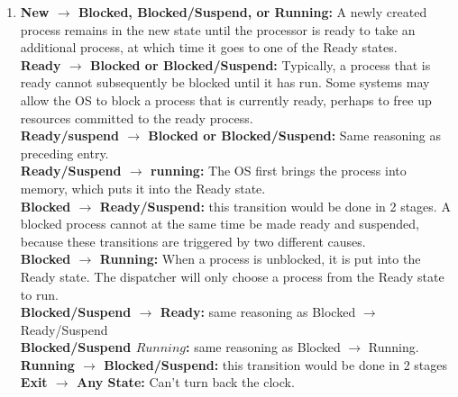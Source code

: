 \documentclass[12pt]{article}
\begin{document}
\begin{enumerate}
{\begin{enumerate}
    \textbf{Running $\rightarrow$ Blocked:} A process is put in the Blocked state if it requests some- thing for which it must wait. A request to the OS is usually in the form of a system service call; that is, a call from the running program to a procedure that is part of the operating system code. For example, a process may request a service from the OS that the OS is not prepared to perform immediately. It can request a resource, such as a file or a shared section of virtual memory, that is not immediately available. Or the process may initiate an action, such as an I/O operation, that must be completed before the process can continue. When processes communicate with each other, a process may be blocked when it is waiting for another process to provide data or waiting for a message from another process.\\
    \textbf{Any State $\rightarrow$ Exit: }Typically, a process terminates while it is running, either because it has completed or because of some fatal fault condition. However, in some operating systems, a process may be terminated by the process that created it or when the parent process is itself terminated. If this is allowed, then a process in any state can be moved to the Exit state.
    \item \textbf{New $\rightarrow$ Blocked, Blocked/Suspend, or Running:} A newly created process remains in the new state until the processor is ready to take an additional process, at which time it goes to one of the Ready states.\\
    \textbf{Ready $\rightarrow$ Blocked or Blocked/Suspend:} Typically, a process that is ready cannot subsequently be blocked until it has run. Some systems may allow the OS to block a process that is currently ready, perhaps to free up resources committed to the ready process.\\
    \textbf{Ready/suspend $\rightarrow$ Blocked or Blocked/Suspend:} Same reasoning as preceding entry.\\
    \textbf{Ready/Suspend $\rightarrow$ running: }The OS first brings the process into memory, which puts it into the Ready state.\\
    \textbf{Blocked $\rightarrow$ Ready/Suspend:} this transition would be done in 2 stages. A blocked process cannot at the same time be made ready and suspended, because these transitions are triggered by two different causes.\\
   \textbf{ Blocked $\rightarrow$ Running:} When a process is unblocked, it is put into the Ready state. The dispatcher will only choose a process from the Ready state to run. \\
    \textbf{Blocked/Suspend $\rightarrow$ Ready: }same reasoning as Blocked $\rightarrow$ Ready/Suspend\\
    \textbf{Blocked/Suspend $Running$:} same reasoning as Blocked $\rightarrow$ Running.
    \textbf{Running $\rightarrow$ Blocked/Suspend:} this transition would be done in 2 stages \\
    \textbf{Exit $\rightarrow$ Any State:} Can't turn back the clock.
\end{enumerate}
}


\end{enumerate}
\end{document}
